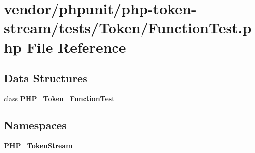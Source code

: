 \section{vendor/phpunit/php-\/token-\/stream/tests/\+Token/\+Function\+Test.php File Reference}
\label{phpunit_2php-token-stream_2tests_2_token_2_function_test_8php}
\subsection*{Data Structures}
\begin{DoxyCompactItemize}
\item 
class {\bf P\+H\+P\+\_\+\+Token\+\_\+\+Function\+Test}
\end{DoxyCompactItemize}
\subsection*{Namespaces}
\begin{DoxyCompactItemize}
\item 
 {\bf P\+H\+P\+\_\+\+Token\+Stream}
\end{DoxyCompactItemize}
